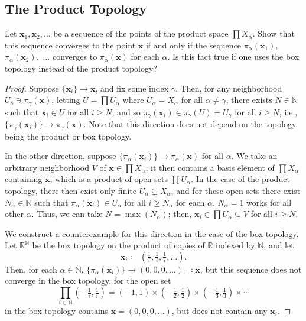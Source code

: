 \documentclass[12pt]{article}
\theoremstyle{remark}
\begin{document}
\subsection{The Product Topology}
\setcounter{subsubsection}{5}
\begin{problem}
  Let $\mathbf{x}_1,\mathbf{x}_2,\ldots$ be a sequence of the points of the
  product space $\prod X_\alpha$. Show that this sequence converges to the point
  $\mathbf{x}$ if and only if the sequence $\pi_\alpha(\mathbf{x}_1),$
  $\pi_\alpha(\mathbf{x}_2),$ $\ldots$ converges to $\pi_\alpha(\mathbf{x})$ for each $\alpha$. Is this fact true if one uses the box topology instead of the product topology?
\end{problem}
\begin{proof}
  Suppose $\{\mathbf{x}_i\} \to \mathbf{x}$, and fix some index $\gamma$. Then,
  for any neighborhood $U_\gamma \ni \pi_\gamma(\mathbf{x})$, letting
  $U = \prod U_\alpha$ where $U_\alpha = X_\alpha$ for all $\alpha \ne \gamma$,
  there exists $N \in \mathbb{N}$ such that $\mathbf{x}_i \in U$ for all $i \ge
  N$, and so $\pi_\gamma(\mathbf{x}_i) \in \pi_\gamma(U) = U_\gamma$ for all $i
  \ge N$, i.e., $\{\pi_\gamma(\mathbf{x}_i)\} \to \pi_\gamma(\mathbf{x})$.
  Note that this direction does not depend on the topology being the product or box topology.
  \par In the other direction, suppose $\{\pi_\alpha(\mathbf{x}_i)\} \to \pi_\alpha(\mathbf{x})$ for all $\alpha$. We take an arbitrary neighborhood $V$ of $\mathbf{x} \in \prod X_\alpha$; it then contains a basis element of $\prod X_\alpha$ containing $\mathbf{x}$, which is a product of open sets $\prod U_\alpha$. In the case of the product topology, there then exist only finite $U_\alpha \subsetneq X_\alpha$, and for these open sets there exist $N_\alpha \in \mathbb{N}$ such that $\pi_\alpha(\mathbf{x}_i) \in U_\alpha$ for all $i \ge N_\alpha$ for each $\alpha$. $N_\alpha = 1$ works for all other $\alpha$. Thus, we can take $N = \max(N_\alpha)$; then, $\mathbf{x}_i \in \prod U_\alpha \subseteq V$ for all $i \ge N$.
  \par We construct a counterexample for this direction in the case of the box
  topology. Let $\mathbb{R}^\mathbb{N}$ be the box topology on the product of
  copies of $\mathbb{R}$ indexed by $\mathbb{N}$, and let
  \begin{equation*}
    \mathbf{x}_i \coloneqq ( \tfrac{1}{i}, \tfrac{1}{i},\tfrac{1}{i},\ldots).
  \end{equation*}
  Then, for each $\alpha \in \mathbb{N}$, $\{\pi_\alpha(\mathbf{x}_i)\} \to
  (0,0,0,\ldots) \eqqcolon \mathbf{x}$, but this sequence does not converge in
  the box topology, for the open set
  \begin{equation*}
    \prod_{i \in \mathbb{N}} ( -\tfrac{1}{i},\tfrac{1}{i} ) = (-1,1)
    \times ( -\tfrac{1}{2},\tfrac{1}{2} ) \times (
    -\tfrac{1}{3},\tfrac{1}{3} ) \times \cdots
  \end{equation*}
  in the box topology contains $\mathbf{x} = (0,0,0,\ldots)$, but does not contain
  any $\mathbf{x}_i$.
\end{proof}
\end{document}

